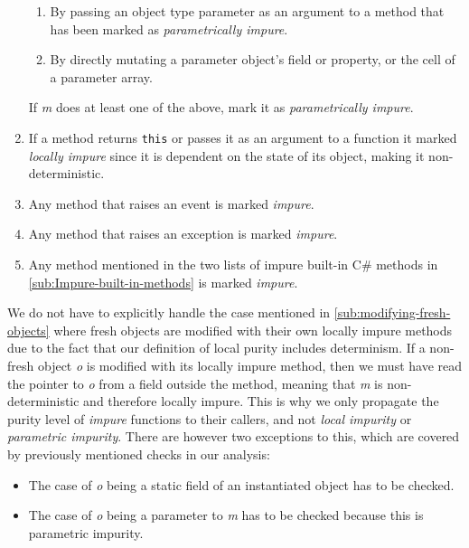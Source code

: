 \documentclass[a4paper,12pt]{article}
\begin{document}
\begin{enumerate}
\begin{enumerate}
      \item By passing an object type parameter as an argument to a method that has been marked as \textit{parametrically impure}. \label{itm:parametrically-impure-sub2}
      \item By directly mutating a parameter object's field or property, or the cell of a parameter array. \label{itm:parametrically-impure-sub3}
    \end{enumerate}
    If \textit{m} does at least one of the above, mark it as \textit{parametrically impure}.
  \item If a method returns \texttt{this} or passes it as an argument to a function it marked \textit{locally impure} since it is dependent on the state of its object, making it non-deterministic.
  \item Any method that raises an event is marked \textit{impure}. \label{itm:raises-event}
  \item Any method that raises an exception is marked \textit{impure}. \label{itm:raises-exception}
  \item Any method mentioned in the two lists of impure built-in C\# methods in \autoref{sub:Impure-built-in-methods} is marked \textit{impure}. \label{itm:impure-built-in}
\end{enumerate}

We do not have to explicitly handle the case mentioned in \autoref{sub:modifying-fresh-objects} where fresh objects are modified with their own locally impure methods due to the fact that our definition of local purity includes determinism. If a non-fresh object \textit{o} is modified with its locally impure method, then we must have read the pointer to \textit{o} from a field outside the method, meaning that \textit{m} is non-deterministic and therefore locally impure. This is why we only propagate the purity level of \textit{impure} functions to their callers, and not \textit{local impurity} or \textit{parametric impurity}. There are however two exceptions to this, which are covered by previously mentioned checks in our analysis:
\begin{itemize}
  \item The case of \textit{o} being a static field of an instantiated object has to be checked.
  \item The case of \textit{o} being a parameter to \textit{m} has to be checked because this is parametric impurity.
\end{itemize}
\end{document}

